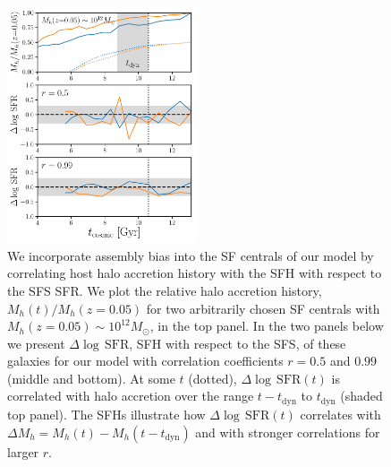 \documentclass[12pt, letterpaper, preprint, tighten]{aastex62}
\begin{document}
\begin{figure}
\begin{center}
\includegraphics[width=0.5\textwidth]{figs/Mhacc_dSFR.pdf}
\caption{We incorporate assembly bias into the SF centrals of our model by 
    correlating host halo accretion history with the SFH with respect to the 
    SFS SFR. We plot the relative halo accretion history, $M_h(t)/M_h(z{=}0.05)$ 
    for two arbitrarily chosen SF centrals with $M_h(z{=}0.05)\sim10^{12}M_\odot$, 
    in the top panel. In the two panels below we present $\Delta\log\,\mathrm{SFR}$, 
    SFH with respect to the SFS, of these galaxies for our model with correlation 
    coefficients $r=0.5$ and $0.99$ (middle and bottom). At some $t$ (dotted), 
    $\Delta\log\,\mathrm{SFR}(t)$ is correlated with halo accretion over the 
    range $t - t_\mathrm{dyn}$ to $t_\mathrm{dyn}$ (shaded top panel). The 
    SFHs illustrate how $\Delta\log\,\mathrm{SFR}(t)$ correlates with 
    $\Delta M_h = M_h(t) - M_h(t-t_\mathrm{dyn})$ and with stronger correlations 
    for larger $r$.}
\label{fig:mhacc_dsfr}
\end{center}
\end{figure}
\end{document}
